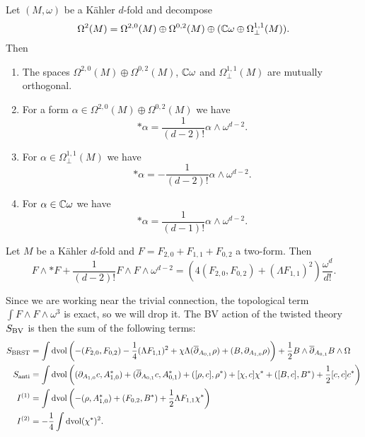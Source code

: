 \documentclass[10pt, oneside]{article}
\begin{document}
\begin{prop}
Let $(M, \omega)$ be a K\"{a}hler $d$-fold and decompose
\[\Omega^2(M) = \Omega^{2, 0}(M)\oplus \Omega^{0, 2}(M)\oplus (\mathbb C\omega\oplus \Omega^{1, 1}_\perp(M)).\]
Then
\begin{enumerate}
\item The spaces $\Omega^{2, 0}(M)\oplus \Omega^{0, 2}(M)$, $\mathbb C\omega$ and $\Omega^{1, 1}_\perp(M)$ are mutually orthogonal.

\item For a form $\alpha\in\Omega^{2, 0}(M)\oplus \Omega^{0, 2}(M)$ we have
\[\ast \alpha = \frac{1}{(d-2)!} \alpha\wedge \omega^{d-2}.\]

\item For $\alpha\in \Omega^{1, 1}_\perp(M)$ we have
\[\ast\alpha = -\frac{1}{(d-2)!} \alpha\wedge \omega^{d-2}.\]

\item For $\alpha\in\mathbb C\omega$ we have
\[\ast \alpha = \frac{1}{(d-1)!} \alpha\wedge \omega^{d-2}.\]
\end{enumerate}
\end{prop}

\begin{corollary} \label{Kahler_YM_term_cor}
Let $M$ be a K\"{a}hler $d$-fold and $F = F_{2, 0} + F_{1, 1} + F_{0, 2}$ a two-form. Then
\[F\wedge \ast F + \frac{1}{(d-2)!} F\wedge F\wedge \omega^{d-2} = \left(4(F_{2, 0}, F_{0, 2}) + (\Lambda F_{1, 1})^2\right) \frac{\omega^d}{d!}.\]
\end{corollary}

Since we are working near the trivial connection, the topological term $\int F\wedge F\wedge \omega^3$ is exact, so we will drop it. The BV action of the twisted theory $S_{\mathrm{BV}}$ is then the sum of the following terms:
\begin{align}
S_{\mathrm{BRST}} &= \int \operatorname{dvol} \left(-(F_{2, 0}, F_{0, 2}) - \frac{1}{4}(\Lambda F_{1, 1})^2 + \chi \Lambda(\overline{\partial}_{A_{0, 1}}\rho) + (B, \partial_{A_{1, 0}} \rho)\right)  + \frac{1}{2}B\wedge \overline{\partial}_{A_{0, 1}} B\wedge\Omega \label{eq:10dBRST} \\
S_{\mathrm{anti}} &= \int \operatorname{dvol}\left((\partial_{A_{1, 0}} c, A_{1, 0}^*) + (\overline{\partial}_{A_{0, 1}} c, A_{0, 1}^*) + ([\rho, c], \rho^*) + [\chi, c]\chi^* + ([B, c], B^*) + \frac{1}{2}[c, c]c^*\right) \label{eq:10danti} \\
I^{(1)} &= \int \operatorname{dvol}\left(-(\rho, A_{1, 0}^*) + (F_{0, 2}, B^*) + \frac{1}{2}\Lambda F_{1, 1} \chi^*\right) \\
I^{(2)} &= -\frac{1}{4}\int \operatorname{dvol} (\chi^*)^2.
\end{align}
\end{document}
